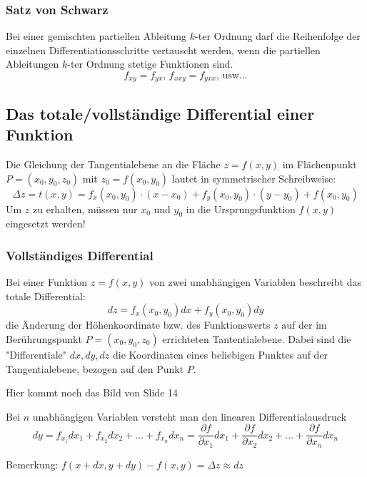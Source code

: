 \subsubsection{Satz von Schwarz}
\begin{definition}
Bei einer gemischten partiellen Ableitung $k$-ter Ordnung darf die Reihenfolge der einzelnen Differentiationsschritte vertauscht werden, wenn die partiellen Ableitungen $k$-ter Ordnung stetige Funktionen sind.
$$ f_{xy} = f_{yx} \text{, }  f_{xxy} = f_{yxx} \text{, usw...}$$
\end{definition}

\subsection{Das totale/vollständige Differential einer Funktion}
\begin{definition}
Die Gleichung der Tangentialebene an die Fläche $z = f(x, y)$ im Flächenpunkt $P=(x_0, y_0, z_0)$ mit $z_0 = f(x_0, y_0)$ lautet in symmetrischer Schreibweise:
$$\Delta z = t(x, y) = f_x(x_0, y_0) \cdot (x-x_0) + f_y(x_0, y_0) \cdot (y - y_0) + f(x_0, y_0)$$
Um $z$ zu erhalten, müssen nur $x_0$ und $y_0$ in die Ursprungsfunktion $f(x,y)$ eingesetzt werden!

\end{definition}

\subsubsection{Vollständiges Differential}
\begin{definition}
Bei einer Funktion  $z=f(x,y)$ von zwei unabhängigen Variablen beschreibt das totale Differential:
$$ dz = f_x(x_0, y_0) dx + f_y(x_0, y_0) dy$$
die Änderung der Höhenkoordinate bzw. des Funktionswerts $z$ auf der im Berührungspunkt $P = (x_0, y_0, z_0)$ errichteten Tantentialebene. Dabei sind die "Differentiale"  $ dx, dy, dz$ die Koordinaten eines beliebigen Punktes auf der Tangentialebene, bezogen auf den Punkt $P$.

Hier kommt noch das Bild von Slide 14

Bei $n$ unabhängigen Variablen versteht man den linearen Differentialausdruck
$$dy = f_{x_1} dx_1 + f_{x_2} dx_2 + ... + f_{x_n} dx_n = \frac{\partial f}{\partial x_1} dx_1 + \frac{\partial f}{\partial x_2} dx_2 + ... + \frac{\partial f}{\partial x_n} dx_n$$

Bemerkung: $f(x+dx, y+dy) - f(x,y) = \Delta z \approx dz$
\end{definition}

